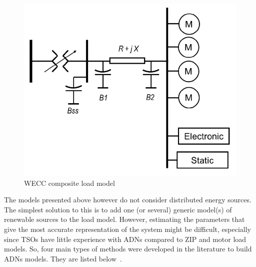 \begin{figure}[t]
    \centering
    \includegraphics[width=0.5\linewidth]{Figs/WECC-composite-load-model.png}
    \caption{WECC composite load model~\cite{NERCloadModelTF}}
    \label{fig:WECC-CLM}
\end{figure}

The models presented above however do not consider distributed energy sources. The simplest solution to this is to add one (or several) generic model(s) of renewable sources to the load model. However, estimating the parameters that give the most accurate representation of the system might be difficult, especially since TSOs have little experience with ADNs compared to ZIP and motor load models. So, four main types of methods were developed in the literature to build ADNs models. They are listed below~\cite{ADNreview2013}.

